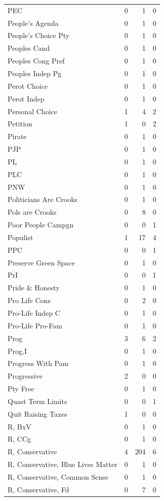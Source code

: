 \begin{supertabular}{lrrr}
PEC & 0 & 1 & 0\\
People's Agenda & 0 & 1 & 0\\
People's Choice Pty & 0 & 1 & 0\\
Peoples Cand & 0 & 1 & 0\\
Peoples Cong Pref & 0 & 1 & 0\\
Peoples Indep Pg & 0 & 1 & 0\\
Perot Choice & 0 & 1 & 0\\
Perot Indep & 0 & 1 & 0\\
Personal Choice & 1 & 4 & 2\\
Petition & 1 & 0 & 2\\
Pirate & 0 & 1 & 0\\
PJP & 0 & 1 & 0\\
PL & 0 & 1 & 0\\
PLC & 0 & 1 & 0\\
PNW & 0 & 1 & 0\\
Politicians Are Crooks & 0 & 1 & 0\\
Pols are Crooks & 0 & 8 & 0\\
Poor People Campgn & 0 & 0 & 1\\
Populist & 1 & 17 & 4\\
PPC & 0 & 0 & 1\\
Preserve Green Space & 0 & 1 & 0\\
PrI & 0 & 0 & 1\\
Pride \& Honesty & 0 & 1 & 0\\
Pro Life Cons & 0 & 2 & 0\\
Pro-Life Indep C & 0 & 1 & 0\\
Pro-Life Pro-Fam & 0 & 1 & 0\\
Prog & 3 & 6 & 2\\
Prog,I & 0 & 1 & 0\\
Progress With Pam & 0 & 1 & 0\\
Progressive & 2 & 0 & 0\\
Pty Free & 0 & 1 & 0\\
Quast Term Limits & 0 & 0 & 1\\
Quit Raising Taxes & 1 & 0 & 0\\
R, BxV & 0 & 1 & 0\\
R, CCg & 0 & 1 & 0\\
R, Conservative & 4 & 204 & 6\\
R, Conservative, Blue Lives Matter & 0 & 1 & 0\\
R, Conservative, Common Sense & 0 & 1 & 0\\
R, Conservative, Fd & 0 & 7 & 0\\

\end{supertabular}
